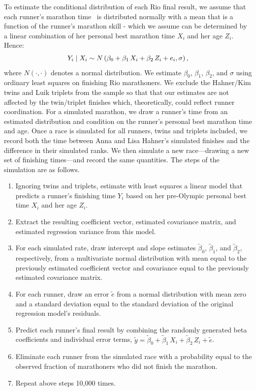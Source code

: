 \documentclass[12pt,titlepage]{article}
\begin{document}
To estimate the conditional distribution of each Rio final result, we
assume that each runner's marathon time \Yi\ is distributed normally
with a mean that is a function of the runner's marathon
skill - which we assume can be determined by a linear combination of her personal best marathon time $X_i$ and her age $Z_i$. Hence:
$$Y_i \mid X_i \sim N\left(\beta_0 + \beta_1\,X_{i}  + \beta_2\,Z_{i} + e_i, \sigma\right),$$
where $N\left(\cdot,\cdot\right)$ denotes a normal
distribution. We estimate $\beta_0$,
$\beta_1$, $\beta_2$, and $\sigma$ using ordinary least squares on
finishing Rio marathoners.  We exclude the Hahner/Kim twins and Luik
triplets from the sample so that that our estimates are not affected
by the twin/triplet finishes which, theoretically, could reflect
runner coordination.  For a simulated marathon, we draw a runner's
time from an estimated distribution and condition on the runner's
personal best marathon time and age.  Once a race is simulated for all
runners, twins and triplets included, we record both the time between
Anna and Lisa Hahner's simulated finishes and the difference in their
simulated ranks.  We then simulate a new race---drawing a new set of
finishing times---and record the same quantities. The steps of the
simulation are as follows.
\begin{enumerate}
\item Ignoring twins and triplets, estimate with least squares a
  linear model that predicts a runner's finishing time $Y_i$ based on
  her pre-Olympic personal best time $X_i$ and her age $Z_i$.
\item Extract the resulting coefficient vector, estimated covariance
  matrix, and estimated regression variance from this model.
\item For each simulated rate, draw intercept and slope estimates
  $\tilde{\beta}_0$, $\tilde{\beta}_1$, and
  $\tilde{\beta}_2$, respectively, from a multivariate normal
  distribution with mean equal to the previously estimated coefficient
  vector and covariance equal to the previously estimated covariance
  matrix.
\item For each runner, draw an error $\tilde{e}$ from a normal
  distribution with mean zero and a standard deviation equal to the
  standard deviation of the original regression model's residuals.
\item Predict each runner's final result by combining the randomly
  generated beta coefficients and individual error terms,
  $\tilde{y} = \tilde{\beta}_0 + \tilde{\beta}_1\,X_i +  \tilde{\beta}_2\,Z_i + \tilde{e}$.
\item Eliminate each runner from the simulated race with a probability
  equal to the observed fraction of marathoners who did not finish the
  marathon.
\item Repeat above steps 10,000 times.
\end{enumerate}
\end{document}
